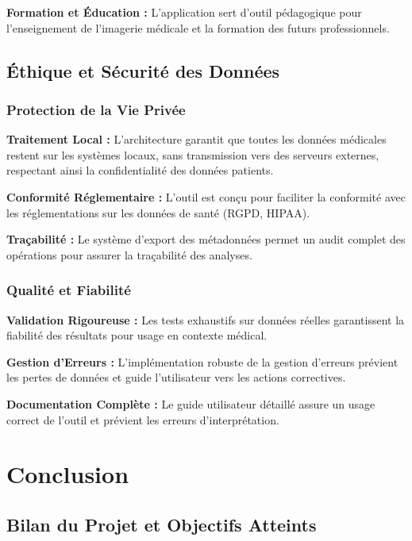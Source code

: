 \documentclass[12pt,a4paper]{article}
\begin{document}
\textbf{Formation et Éducation :} L'application sert d'outil pédagogique pour l'enseignement de l'imagerie médicale et la formation des futurs professionnels.

\subsection{Éthique et Sécurité des Données}

\subsubsection{Protection de la Vie Privée}

\textbf{Traitement Local :} L'architecture garantit que toutes les données médicales restent sur les systèmes locaux, sans transmission vers des serveurs externes, respectant ainsi la confidentialité des données patients.

\textbf{Conformité Réglementaire :} L'outil est conçu pour faciliter la conformité avec les réglementations sur les données de santé (RGPD, HIPAA).

\textbf{Traçabilité :} Le système d'export des métadonnées permet un audit complet des opérations pour assurer la traçabilité des analyses.

\subsubsection{Qualité et Fiabilité}

\textbf{Validation Rigoureuse :} Les tests exhaustifs sur données réelles garantissent la fiabilité des résultats pour usage en contexte médical.

\textbf{Gestion d'Erreurs :} L'implémentation robuste de la gestion d'erreurs prévient les pertes de données et guide l'utilisateur vers les actions correctives.

\textbf{Documentation Complète :} Le guide utilisateur détaillé assure un usage correct de l'outil et prévient les erreurs d'interprétation.

\newpage

\section{Conclusion}

\subsection{Bilan du Projet et Objectifs Atteints}
\end{document}
